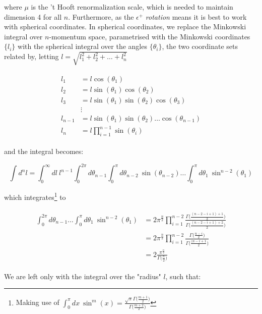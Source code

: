 \documentclass[10pt,twoside]{report}
\begin{document}
	\noindent where $\mu$ is the 't Hooft renormalization scale, which is needed to maintain dimension 4 for all $n$. Furthermore, as the $\epsilon^+$ \emph{rotation} means it is best to work with spherical coordinates. In spherical coordinates, we replace the Minkowski integral over $n$-momentum space, parametrised with the Minkowski coordinates $\{l_i\}$ with the spherical integral over the angles $\{\theta_i\}$, the two coordinate sets related by, letting $l=\sqrt{l_1^2+l_2^2+\ldots +l_n^2}$
	
	\begin{align}
		\begin{split}
			l_1 &= l\cos(\theta_1) \\
			l_2 &= l\sin(\theta_1)\cos(\theta_2) \\
			l_3 &= l\sin(\theta_1)\sin(\theta_2)\cos(\theta_3) \\
			&\vdots \\
			l_{n-1} &= l\sin(\theta_1)\sin(\theta_2)\ldots\cos(\theta_{n-1}) \\
			l_{n} &= l\prod_{i=1}^{n-1}\sin(\theta_i)
		\end{split}
	\end{align}
	
	\noindent and the integral becomes:
	
	\begin{equation}
		\int d^nl = \int_0^\infty dl\:l^{n-1}\int_0^{2\pi}d\theta_{n-1}\int_0^\pi d\theta_{n-2}\:\sin(\theta_{n-2})  \ldots \int_0^\pi d\theta_1\:\sin^{n-2}(\theta_1)
	\end{equation}
	
	\noindent which integrates\footnote{Making use of $\int_0^\pi dx\:\sin^{m}(x) = \frac{\sqrt{\pi}\Gamma\big(\frac{m+1}{2}\big)}{\Gamma\big(\frac{m+2}{2}\big)}$} to
	
	\begin{align}
		\begin{split}
		\int_0^{2\pi}d\theta_{n-1} \ldots \int_0^\pi d\theta_1\:\sin^{n-2}(\theta_1) &= 2\pi^{\frac{n}{2}} \prod_{i=1}^{n-2} \frac{\Gamma\big(\frac{(n-2-i+1)+1}{2}\big)}{\Gamma\big(\frac{(n-2-i+1)+2}{2}\big)} \\
		&= 2\pi^{\frac{n}{2}} \prod_{i=1}^{n-2} \frac{\Gamma\big(\frac{n-i}{2}\big)}{\Gamma\big(\frac{(n-i+1}{2}\big)} \\
		&= 2\frac{\pi^{\frac{n}{2}}}{\Gamma\big(\frac{n}{2}\big)}
		\end{split}
	\end{align}
	
	We are left only with the integral over the "radius" $l$, such that:
	
\end{document}
